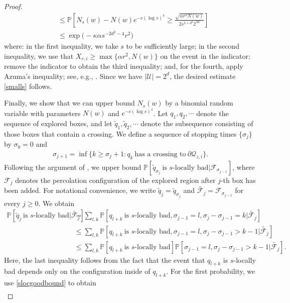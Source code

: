 \documentclass[11pt]{article}
\theoremstyle{definition}
\theoremstyle{remark}
\newcommand{\bP}{\mathbb{P}}
\numberwithin{equation}{section}
\theoremstyle{plain}
\theoremstyle{definition}
\theoremstyle{remark}
\theoremstyle{plain}
\begin{document}
\begin{proof}
\begin{align*}
&\leq \bP\left[N_{s}(w)-N(w)e^{-c(\log s)^4}\ge \frac{\sqrt{\alpha r^2 N(w)}}{2s^{2+d^2}2^{3d}}\right]\\
&\le \exp\big(-\kappa \alpha s^{-2d^2-4} r^2\big)
  \end{align*}
  where: in the first inequality, we take $s$ to be sufficiently large; in the second inequality, we use that $X_{r,i}\geq \max\{\alpha r^2,N(w)\}$ on the event in the indicator; remove the indicator to obtain the third inequality; and, for the fourth, apply Azuma's inequality; see, e.g., \cite[Theorem~7.2.1]{AS08}. Since we have $|\mathcal U|=2^d$, the desired estimate \eqref{smalls} follows.

  Finally, we show that we can upper bound $N_s(w)$ by a binomial random variable with parameters $N(w)$ and $e^{-c(\log s)^4}$. Let $q_1,q_2,\cdots$ denote the sequence of explored boxes, and let $\tilde{q}_1,\tilde{q}_2, \cdots$ denote the subsequence consisting of those boxes that contain a crossing. We define a sequence of stopping times $\{\sigma_j\}$ by $\sigma_0=0$ and
  \begin{align*}
      \sigma_{j+1}=\inf\{k\ge \sigma_j+1: q_k~\text{has a crossing to}~\partial\mathcal Q_{z,i}\}.
  \end{align*}
  Following the argument of \cite[Proposition~5.7]{ASS}, we upper bound $\bP[\tilde{q}_{\sigma_j}~\text{is $s$-locally bad}|\mathcal F_{\sigma_{j-1}}]$, where $\mathcal F_j$ denotes the percolation configuration of the explored region after $j$-th box has been added. For notational convenience, we write $\tilde{q}_j=\tilde{q}_{\sigma_{j}}$ and $\tilde{\mathcal F_j}=\mathcal F_{\sigma_{j-1}}$ for every $j\ge0$. We obtain
  \begin{align*}
     \bP[\tilde{q}_j~\text{is $s$-locally bad}|\tilde{\mathcal F_j}]&=\sum_{l,k}\bP[q_{l+k}~\text{is $s$-locally bad}, \sigma_{j-1}=l,\sigma_j-\sigma_{j-1}=k|\tilde{\mathcal F_j}]\\
     &\le \sum_{l,k}\bP[q_{l+k}~\text{is $s$-locally bad}, \sigma_{j-1}=l,\sigma_j-\sigma_{j-1}>k-1|\tilde{\mathcal F_j}]\\
     &\le \sum_{l,k}\bP[q_{l+k}~\text{is $s$-locally bad}] \bP[\sigma_{j-1}=l,\sigma_j-\sigma_{j-1}>k-1|\tilde{\mathcal F_j}].
  \end{align*}
  Here, the last inequality follows from the fact that the event that $q_{l+k}$ is $s$-locally bad depends only on the configuration inside of $q_{l+k}$. For the first probability, we use \eqref{slocgoodbound} to obtain
  \begin{align*}

\end{align*}
\end{proof}
\end{document}

